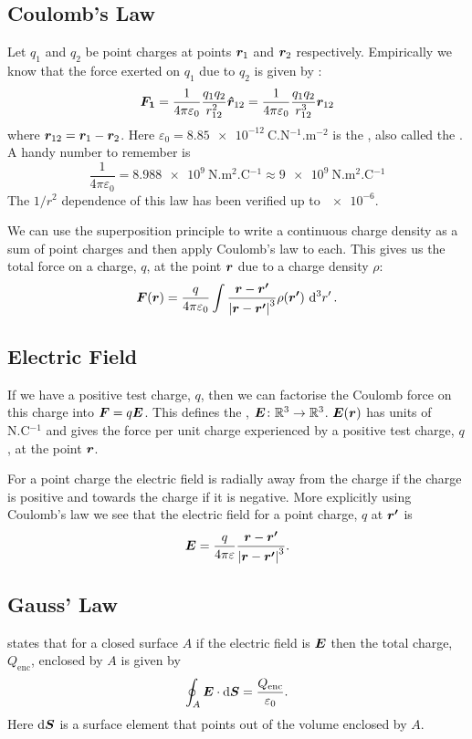     \subsection{Coulomb's Law}
    Let \(q_1\) and \(q_2\) be point charges at points \(\bm{r}_1\) and \(\bm{r}_2\) respectively.
    Empirically we know that the force exerted on \(q_1\) due to \(q_2\) is given by :
    \[\bm{F_1} = \frac{1}{4\pi\varepsilon_0}\frac{q_1q_2}{r_{12}^2}\bm{\hat{r}}_{12} = \frac{1}{4\pi\varepsilon_0}\frac{q_1q_2}{r_{12}^3}\bm{r}_{12}\]
    where \(\bm{r}_{12} = \bm{r}_1 - \bm{r}_2\).
    Here \(\varepsilon_0 = \SI{8.85e-12}{\coulomb.\newton^{-1}.\metre^{-2}}\) is the , also called the .
    A handy number to remember is
    \[\frac{1}{4\pi\varepsilon_0} = \SI{8.988e9}{\newton.\metre^2.\coulomb^{-1}} \approx \SI{9e9}{\newton.\metre^2.\coulomb^{-1}}\]
    The \(1/r^2\) dependence of this law has been verified up to \(\num{e-6}\).
    
    We can use the superposition principle to write a continuous charge density as a sum of point charges and then apply Coulomb's law to each.
    This gives us the total force on a charge, \(q\), at the point \(\bm{r}\) due to a charge density \(\rho\):
    \[\bm{F}(\bm{r}) = \frac{q}{4\pi\varepsilon_0}\int \frac{\bm{r} - \bm{r'}}{\abs{\bm{r} - \bm{r'}}^3}\rho(\bm{r'})\,\dd[3]{r'}.\]
    
    \subsection{Electric Field}
    If we have a positive test charge, \(q\), then we can factorise the Coulomb force on this charge into \(\bm{F} = q\bm{E}\).
    This defines the , \(\bm{E}\colon\mathbb{R}^3\to\mathbb{R}^3\).
    \(\bm{E}(\bm{r})\) has units of \(\si{\newton.\coulomb^{-1}}\) and gives the force per unit charge experienced by a positive test charge, \(q\), at the point \(\bm{r}\).
    
    For a point charge the electric field is radially away from the charge if the charge is positive and towards the charge if it is negative.
    More explicitly using Coulomb's law we see that the electric field for a point charge, \(q\) at \(\bm{r'}\) is
    \[\bm{E} = \frac{q}{4\pi\varepsilon}\frac{\bm{r} - \bm{r'}}{\abs{\bm{r} - \bm{r'}}^3}.\]
    
    \subsection{Gauss' Law}\label{sec:Gauss' law}
     states that for a closed surface \(A\) if the electric field is \(\bm{E}\) then the total charge, \(Q_\mathrm{enc}\), enclosed by \(A\) is given by
    \[\oint_A \bm{E}\cdot\dd{\bm{S}} = \frac{Q_\mathrm{enc}}{\varepsilon_0}.\]
    Here \(\dd{\bm{S}}\) is a surface element that points out of the volume enclosed by \(A\).
    
